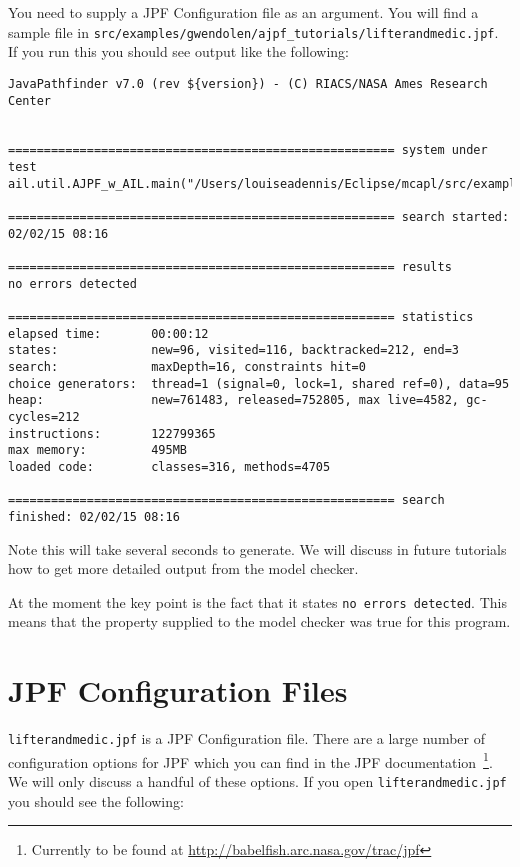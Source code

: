 \documentclass[a4]{article}
\begin{document}
You need to supply a JPF Configuration file as an argument.  You will find a sample file in \texttt{src/examples/gwendolen/ajpf\_tutorials/lifterandmedic.jpf}.  If you run this you should see output like the following:

\begin{verbatim}
JavaPathfinder v7.0 (rev ${version}) - (C) RIACS/NASA Ames Research Center


====================================================== system under test
ail.util.AJPF_w_AIL.main("/Users/louiseadennis/Eclipse/mcapl/src/examples/gwendolen/ail_tutorials/tutorial1/answers/ex2.ail","/Users/louiseadennis/Eclipse/mcapl/src/examples/gwendolen/ajpf_tutorials/tutorial1/lifterandmedic.psl","1")

====================================================== search started: 02/02/15 08:16

====================================================== results
no errors detected

====================================================== statistics
elapsed time:       00:00:12
states:             new=96, visited=116, backtracked=212, end=3
search:             maxDepth=16, constraints hit=0
choice generators:  thread=1 (signal=0, lock=1, shared ref=0), data=95
heap:               new=761483, released=752805, max live=4582, gc-cycles=212
instructions:       122799365
max memory:         495MB
loaded code:        classes=316, methods=4705

====================================================== search finished: 02/02/15 08:16
\end{verbatim}

Note this will take several seconds to generate.  We will discuss in future tutorials how to get more detailed output from the model checker.

At the moment the key point is the fact that it states \texttt{no errors detected}.  This means that the property supplied to the model checker was true for this program.

\section{JPF Configuration Files}

\texttt{lifterandmedic.jpf} is a JPF Configuration file.  There are a large number of configuration options for JPF which you can find in the JPF documentation~\footnote{Currently to be found at \url{http://babelfish.arc.nasa.gov/trac/jpf}}.  We will only discuss a handful of these options.  If you open \texttt{lifterandmedic.jpf} you should see the following:
\end{document}
